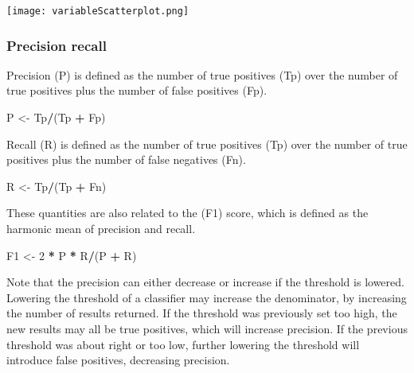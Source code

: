 \documentclass[]{article}
\newenvironment{Shaded}{\begin{snugshade}}{\end{snugshade}}
\newcommand{\DecValTok}[1]{\textcolor[rgb]{0.00,0.00,0.81}{#1}}
\newcommand{\StringTok}[1]{\textcolor[rgb]{0.31,0.60,0.02}{#1}}
\newcommand{\OperatorTok}[1]{\textcolor[rgb]{0.81,0.36,0.00}{\textbf{#1}}}
\newcommand{\NormalTok}[1]{#1}
\begin{document}
\texttt{[image: variableScatterplot.png]}

\newpage

\subsubsection{Precision recall}\label{precision-recall}

Precision (P) is defined as the number of true positives (Tp) over the
number of true positives plus the number of false positives (Fp).

\begin{Shaded}
\begin{Highlighting}[]
\NormalTok{P <-}\StringTok{ }\NormalTok{Tp}\OperatorTok{/}\NormalTok{(Tp }\OperatorTok{+}\StringTok{ }\NormalTok{Fp)}
\end{Highlighting}
\end{Shaded}

Recall (R) is defined as the number of true positives (Tp) over the
number of true positives plus the number of false negatives (Fn).

\begin{Shaded}
\begin{Highlighting}[]
\NormalTok{R <-}\StringTok{ }\NormalTok{Tp}\OperatorTok{/}\NormalTok{(Tp }\OperatorTok{+}\StringTok{ }\NormalTok{Fn)}
\end{Highlighting}
\end{Shaded}

These quantities are also related to the (F1) score, which is defined as
the harmonic mean of precision and recall.

\begin{Shaded}
\begin{Highlighting}[]
\NormalTok{F1 <-}\StringTok{ }\DecValTok{2} \OperatorTok{*}\StringTok{ }\NormalTok{P }\OperatorTok{*}\StringTok{ }\NormalTok{R}\OperatorTok{/}\NormalTok{(P }\OperatorTok{+}\StringTok{ }\NormalTok{R)}
\end{Highlighting}
\end{Shaded}

Note that the precision can either decrease or increase if the threshold
is lowered. Lowering the threshold of a classifier may increase the
denominator, by increasing the number of results returned. If the
threshold was previously set too high, the new results may all be true
positives, which will increase precision. If the previous threshold was
about right or too low, further lowering the threshold will introduce
false positives, decreasing precision.
\end{document}
